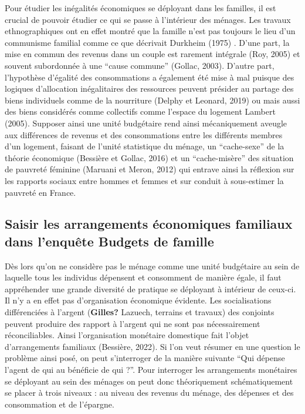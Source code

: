 \documentclass[
  12pt,
]{book}
\begin{document}
Pour étudier les inégalités économiques se déployant dans les familles,
il est crucial de pouvoir étudier ce qui se passe à l'intérieur des
ménages. Les travaux ethnographiques ont en effet montré que la famille
n'est pas toujours le lieu d'un communisme familial comme ce que
décrivait Durkheim (1975) . D'une part, la mise en commun des revenus
dans un couple est rarement intégrale (Roy, 2005) et souvent subordonnée
à une ``cause commune'' (Gollac, 2003). D'autre part, l'hypothèse
d'égalité des consommations a également été mise à mal puisque des
logiques d'allocation inégalitaires des ressources peuvent présider au
partage des biens individuels comme de la nourriture (Delphy et Leonard,
2019) ou mais aussi des biens considérés comme collectifs comme l'espace
du logement Lambert (2005). Supposer ainsi une unité budgétaire rend
ainsi mécaniquement aveugle aux différences de revenus et des
consommations entre les différents membres d'un logement, faisant de
l'unité statistique du ménage, un ``cache-sexe'' de la théorie
économique (Bessière et Gollac, 2016) et un ``cache-misère'' des
situation de pauvreté féminine (Maruani et Meron, 2012) qui entrave
ainsi la réflexion sur les rapports sociaux entre hommes et femmes et
sur conduit à sous-estimer la pauvreté en France.

\subsection{Saisir les arrangements économiques familiaux dans l'enquête
Budgets de
famille}\label{saisir-les-arrangements-uxe9conomiques-familiaux-dans-lenquuxeate-budgets-de-famille}

Dès lors qu'on ne considère pas le ménage comme une unité budgétaire au
sein de laquelle tous les individus dépensent et consomment de manière
égale, il faut appréhender une grande diversité de pratique se déployant
à intérieur de ceux-ci. Il n'y a en effet pas d'organisation économique
évidente. Les socialisations différenciées à l'argent (\textbf{Gilles?}
Lazuech, terrains et travaux) des conjoints peuvent produire des rapport
à l'argent qui ne sont pas nécessairement réconciliables. Ainsi
l'organisation monétaire domestique fait l'objet d'arrangements
familiaux (Bessière, 2022). Si l'on veut résumer en une question le
problème ainsi posé, on peut s'interroger de la manière suivante ``Qui
dépense l'agent de qui au bénéficie de qui ?''. Pour interroger les
arrangements monétaires se déployant au sein des ménages on peut donc
théoriquement schématiquement se placer à trois niveaux : au niveau des
revenus du ménage, des dépenses et des consommation et de l'épargne.
\end{document}
